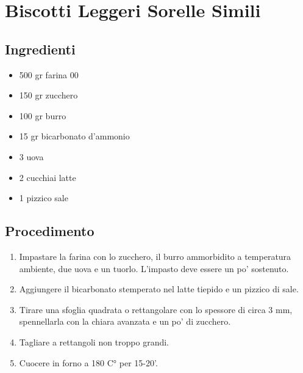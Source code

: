 \section{Biscotti Leggeri Sorelle Simili}
\subsection{Ingredienti}
\begin{itemize}
\item 500 gr farina 00  
\item 150 gr zucchero  
\item 100 gr burro  
\item 15 gr bicarbonato d'ammonio  
\item 3 uova   
\item 2 cucchiai latte  
\item 1 pizzico sale
\end{itemize}
\subsection{Procedimento}
\begin{enumerate}
\item  Impastare la farina con lo zucchero, il burro ammorbidito a temperatura ambiente, due uova e un tuorlo. L'impasto deve essere un po' sostenuto.  
\item  Aggiungere il bicarbonato stemperato nel latte tiepido e un pizzico di sale.  
\item  Tirare una sfoglia quadrata o rettangolare con lo spessore di circa 3 mm, spennellarla con la chiara avanzata e un po' di zucchero.  
\item  Tagliare a rettangoli non troppo grandi.  
\item  Cuocere in forno a 180 C° per 15-20'.
\end{enumerate}
